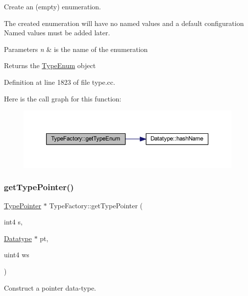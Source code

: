 Create an (empty) enumeration. 

The created enumeration will have no named values and a default configuration Named values must be added later. 
\begin{DoxyParams}{Parameters}
{\em n} & is the name of the enumeration \\
\hline
\end{DoxyParams}
\begin{DoxyReturn}{Returns}
the \mbox{\hyperlink{class_type_enum}{Type\+Enum}} object 
\end{DoxyReturn}


Definition at line 1823 of file type.\+cc.

Here is the call graph for this function\+:
\nopagebreak
\begin{figure}[H]
\begin{center}
\leavevmode
\includegraphics[width=350pt]{class_type_factory_a3bb1aba15e198a7ba2b67741c571de3a_cgraph}
\end{center}
\end{figure}
\mbox{\label{class_type_factory_a2ff26aa7e6197ffb865907313f752d43}} 
\subsubsection{\texorpdfstring{getTypePointer()}{getTypePointer()}}
{\footnotesize\ttfamily \mbox{\hyperlink{class_type_pointer}{Type\+Pointer}} $\ast$ Type\+Factory\+::get\+Type\+Pointer (\begin{DoxyParamCaption}\item[{int4}]{s,  }\item[{\mbox{\hyperlink{class_datatype}{Datatype}} $\ast$}]{pt,  }\item[{uint4}]{ws }\end{DoxyParamCaption})}



Construct a pointer data-\/type. 

